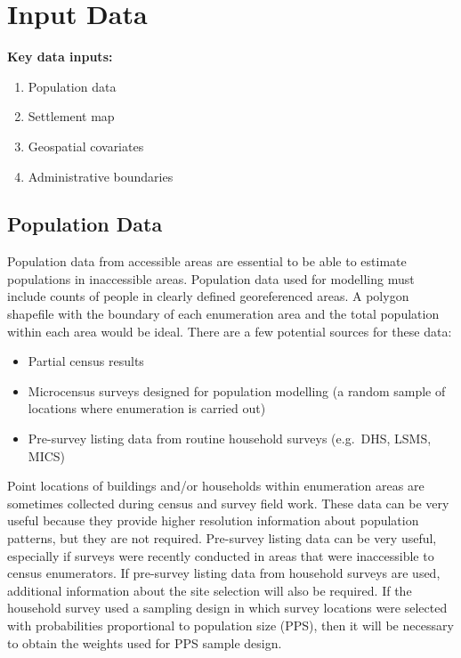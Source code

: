 \documentclass[]{book}
\providecommand{\tightlist}{%
  \setlength{\itemsep}{0pt}\setlength{\parskip}{0pt}}
\begin{document}
\section{Input Data}\label{input-data-3}

\textbf{Key data inputs:}

\begin{enumerate}
\def\labelenumi{\arabic{enumi}.}
\tightlist
\item
  Population data\\
\item
  Settlement map\\
\item
  Geospatial covariates\\
\item
  Administrative boundaries
\end{enumerate}

\subsection{Population Data}\label{population-data-1}

Population data from accessible areas are essential to be able to
estimate populations in inaccessible areas. Population data used for
modelling must include counts of people in clearly defined georeferenced
areas. A polygon shapefile with the boundary of each enumeration area
and the total population within each area would be ideal. There are a
few potential sources for these data:

\begin{itemize}
\tightlist
\item
  Partial census results\\
\item
  Microcensus surveys designed for population modelling (a random sample
  of locations where enumeration is carried out)\\
\item
  Pre-survey listing data from routine household surveys (e.g.~DHS,
  LSMS, MICS)
\end{itemize}

Point locations of buildings and/or households within enumeration areas
are sometimes collected during census and survey field work. These data
can be very useful because they provide higher resolution information
about population patterns, but they are not required. Pre-survey listing
data can be very useful, especially if surveys were recently conducted
in areas that were inaccessible to census enumerators. If pre-survey
listing data from household surveys are used, additional information
about the site selection will also be required. If the household survey
used a sampling design in which survey locations were selected with
probabilities proportional to population size (PPS), then it will be
necessary to obtain the weights used for PPS sample design.
\end{document}
